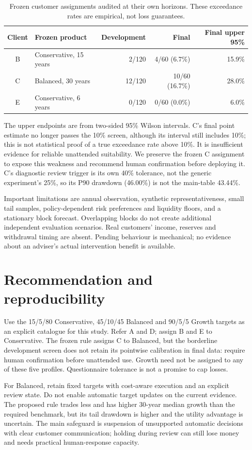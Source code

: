 \documentclass[11pt,a4paper]{article}
\begin{document}
\begin{table}[H]\centering
\caption{Frozen customer assignments audited at their own horizons. These
exceedance rates are empirical, not loss guarantees.}
\begin{tabular}{clrrr}\toprule
Client & Frozen product & Development & Final & Final upper 95\%\\\midrule
B & Conservative, 15 years & 2/120 & 4/60 (6.7\%) & 15.9\%\\
C & Balanced, 30 years & 12/120 & 10/60 (16.7\%) & 28.0\%\\
E & Conservative, 6 years & 0/120 & 0/60 (0.0\%) & 6.0\%\\\bottomrule
\end{tabular}
\end{table}
The upper endpoints are from two-sided 95\% Wilson intervals. C's final point
estimate no longer passes the 10\% screen, although its interval still includes
10\%; this is not statistical proof of a true exceedance rate above 10\%.
It is insufficient evidence for reliable unattended suitability. We preserve
the frozen C assignment to expose this weakness and recommend human confirmation
before deploying it. C's diagnostic review trigger is its own 40\% tolerance,
not the generic experiment's 25\%, so its P90 drawdown (46.00\%) is not the
main-table 43.44\%.

Important limitations are annual observation, synthetic representativeness,
small tail samples, policy-dependent risk preferences and liquidity floors,
and a stationary block forecast. Overlapping blocks do not create additional
independent evaluation scenarios. Real customers' income, reserves and
withdrawal timing are absent. Pending behaviour is mechanical; no evidence
about an adviser's actual intervention benefit is available.

\newpage
\section{Recommendation and reproducibility}
Use the 15/5/80 Conservative, 45/10/45 Balanced and 90/5/5 Growth targets as
an explicit catalogue for this study. Refer A and D; assign B and E to
Conservative. The frozen rule assigns C to Balanced, but the
borderline development screen does not retain its pointwise calibration in
final data: require human confirmation before unattended use. Growth need not
be assigned to any of these five profiles. Questionnaire tolerance is not a
promise to cap losses.

For Balanced, retain fixed targets with cost-aware execution and an explicit
review state. Do not enable automatic target updates on the current evidence.
The proposed rule trades less and has higher 30-year median growth than the
required benchmark, but its tail drawdown is higher and the utility advantage
is uncertain. The main safeguard is suspension of unsupported automatic
decisions with clear customer communication; holding during review can still
lose money and needs practical human-response capacity.
\end{document}
